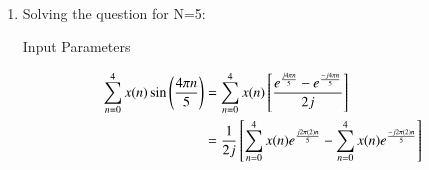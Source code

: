 \documentclass[journal,12pt,onecolumn]{IEEEtran}
\theoremstyle{remark}
\begin{document}
\solution\\
\fi
\begin{enumerate}
\item Solving the question for N=5:
\begin{table}[h!]
 	\centering
 	\resizebox{6 cm}{!}{
 		
 	}
 	\vspace{6 pt}
 	\caption{Input Parameters}
 	\label{tab:gate23ec47tab2}
 \end{table} 
\begin{align}
\sum\limits_{n=0}^{4}x(n) \sin\brak{\frac{4\pi n}{5}}&=\sum\limits_{n=0}^{4}x(n)\sbrak{\frac{e^{\frac{j4\pi n}{5}}-e^{\frac{-j4\pi n}{5}}}{2j}}\\
&=\frac{1}{2j}\sbrak{\sum\limits_{n=0}^{4}x(n)e^{\frac{j2\pi (2)n}{5}}-\sum\limits_{n=0}^{4}x(n)e^{\frac{-j2\pi (2)n}{5}}}\label{eq:gate23ec47eq2}
\end{align}


\end{enumerate}
\end{document}
